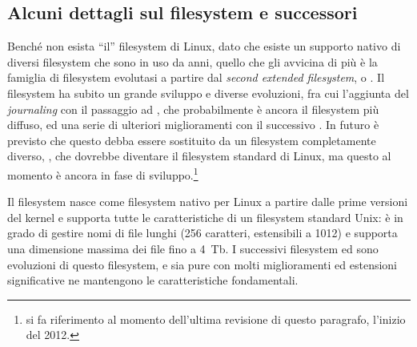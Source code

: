 

\subsection{Alcuni dettagli sul filesystem  e successori}
\label{sec:file_ext2}

Benché non esista ``il'' filesystem di Linux, dato che esiste un supporto
nativo di diversi filesystem che sono in uso da anni, quello che gli avvicina
di più è la famiglia di filesystem evolutasi a partire dal \textit{second
  extended filesystem}, o . Il filesystem  ha subito un
grande sviluppo e diverse evoluzioni, fra cui l'aggiunta del
\textit{journaling} con il passaggio ad , che probabilmente è ancora
il filesystem più diffuso, ed una serie di ulteriori miglioramenti con il
successivo . In futuro è previsto che questo debba essere sostituito
da un filesystem completamente diverso, , che dovrebbe diventare il
filesystem standard di Linux, ma questo al momento è ancora in fase di
sviluppo.\footnote{si fa riferimento al momento dell'ultima revisione di
  questo paragrafo, l'inizio del 2012.}

Il filesystem  nasce come filesystem nativo per Linux a partire
dalle prime versioni del kernel e supporta tutte le caratteristiche di un
filesystem standard Unix: è in grado di gestire nomi di file lunghi (256
caratteri, estensibili a 1012) e supporta una dimensione massima dei file fino
a 4~Tb. I successivi filesystem  ed  sono evoluzioni di
questo filesystem, e sia pure con molti miglioramenti ed estensioni
significative ne mantengono le caratteristiche fondamentali.

